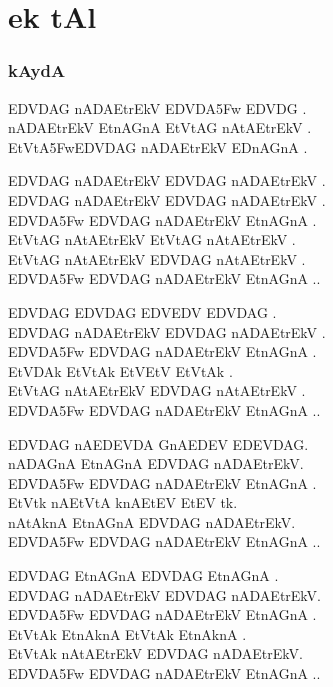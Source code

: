 \def\DevnagVersion{2.17}\documentclass{tufte-book}
\def\samaindent{\parindent=0.5in}
\def\dnitem#1{\noindent\llap{#1\space}\leftskip\parindent}
\begin{document}
{\dn\chapter{ ek tAl}}

\subsection{{\dn kAydA \dnnum {}}}

{\dn \dnnum
{\dnsamaveda \samaindent
\dnitem{kAydA}

EDVDAG\? nADAEtrEkV EDVDA\35Fw EDVDG\? .\\
nADAEtrEkV EtnAG\?nA EtVtAG\? nAtAEtrEkV .\\
EtVtA\35FwEDVDAG\? nADAEtrEkV EDnAG\?nA .

\dnitem{plVA \rn{1}}

EDVDAG\? nADAEtrEkV EDVDAG\? nADAEtrEkV .\\
EDVDAG\? nADAEtrEkV EDVDAG\? nADAEtrEkV .\\
EDVDA\35Fw EDVDAG\? nADAEtrEkV EtnAG\?nA .\\
EtVtAG\? nAtAEtrEkV EtVtAG\? nAtAEtrEkV .\\
EtVtAG\? nAtAEtrEkV EDVDAG\? nAtAEtrEkV .\\
EDVDA\35Fw EDVDAG\? nADAEtrEkV EtnAG\?nA ..

\dnitem{\rn{1}{\rs -\re}\rn{2}}

EDVDAG\?  EDVDAG\? EDVEDV EDVDAG\? .\\
EDVDAG\? nADAEtrEkV EDVDAG\? nADAEtrEkV .\\
EDVDA\35Fw EDVDAG\? nADAEtrEkV EtnAG\?nA .\\
EtVDAk\?  EtVtAk\? EtVEtV EtVtAk\? .\\
EtVtAG\? nAtAEtrEkV EDVDAG\? nAtAEtrEkV .\\
EDVDA\35Fw EDVDAG\? nADAEtrEkV EtnAG\?nA ..

\dnitem{\rn{1}{\rs -\re}\rn{3}}

EDVDAG\?  nAEDEVDA G\?nAEDEV EDEVDAG\?.\\
nADAG\?nA  EtnAG\?nA EDVDAG\? nADAEtrEkV.\\
EDVDA\35Fw EDVDAG\? nADAEtrEkV EtnAG\?nA .\\
EtVtk\?  nAEtVtA k\?nAEtEV EtEV tk\?.\\
nAtAk\?nA  EtnAG\?nA EDVDAG\? nADAEtrEkV.\\
EDVDA\35Fw EDVDAG\? nADAEtrEkV EtnAG\?nA ..

\dnitem{\rn{1}{\rs -\re}\rn{4}}

EDVDAG\?  EtnAG\?nA EDVDAG\? EtnAG\?nA .\\
EDVDAG\? nADAEtrEkV  EDVDAG\? nADAEtrEkV.\\
EDVDA\35Fw EDVDAG\? nADAEtrEkV EtnAG\?nA .\\
EtVtAk\?  EtnAk\?nA EtVtAk\? EtnAk\?nA .\\
EtVtAk\? nAtAEtrEkV  EDVDAG\? nADAEtrEkV.\\
EDVDA\35Fw EDVDAG\? nADAEtrEkV EtnAG\?nA ..

}}
\end{document}
